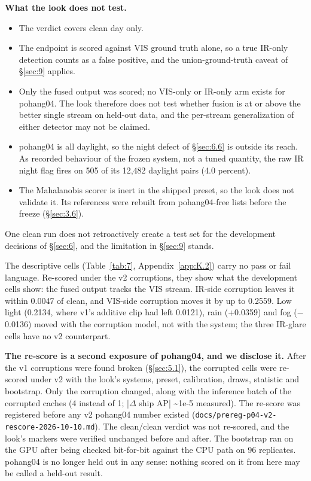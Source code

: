 \documentclass[10pt]{article}
\begin{document}
\textbf{What the look does not test.}
\begin{itemize}
\item The verdict covers clean day only.
\item The endpoint is scored against VIS ground truth alone, so a true IR-only detection counts as a false positive, and the union-ground-truth caveat of \S\ref{sec:9} applies.
\item Only the fused output was scored; no VIS-only or IR-only arm exists for pohang04. The look therefore does not test whether fusion is at or above the better single stream on held-out data, and the per-stream generalization of either detector may not be claimed.
\item pohang04 is all daylight, so the night defect of \S\ref{sec:6.6} is outside its reach. As recorded behaviour of the frozen system, not a tuned quantity, the raw IR night flag fires on 505 of its 12,482 daylight pairs (4.0 percent).
\item The Mahalanobis scorer is inert in the shipped preset, so the look does not validate it. Its references were rebuilt from pohang04-free lists before the freeze (\S\ref{sec:3.6}).
\end{itemize}

One clean run does not retroactively create a test set for the development decisions of \S\ref{sec:6}, and the limitation in \S\ref{sec:9} stands.

The descriptive cells (Table~\ref{tab:7}, Appendix~\ref{app:K.2}) carry no pass or fail language. Re-scored under the v2 corruptions, they show what the development cells show: the fused output tracks the VIS stream. IR-side corruption leaves it within 0.0047 of clean, and VIS-side corruption moves it by up to 0.2559. Low light (0.2134, where v1's additive clip had left 0.0121), rain (+0.0359) and fog ($-$0.0136) moved with the corruption model, not with the system; the three IR-glare cells have no v2 counterpart.

\textbf{The re-score is a second exposure of pohang04, and we disclose it.} After the v1 corruptions were found broken (\S\ref{sec:5.1}), the corrupted cells were re-scored under v2 with the look's systems, preset, calibration, draws, statistic and bootstrap. Only the corruption changed, along with the inference batch of the corrupted caches (4 instead of 1; |$\Delta$ ship AP| \textasciitilde{}1e-5 measured). The re-score was registered before any v2 pohang04 number existed (\texttt{docs/\allowbreak{}prereg-p04-v2-rescore-2026-10-10.md}). The clean/clean verdict was not re-scored, and the look's markers were verified unchanged before and after. The bootstrap ran on the GPU after being checked bit-for-bit against the CPU path on 96 replicates. pohang04 is no longer held out in any sense: nothing scored on it from here may be called a held-out result.
\end{document}
